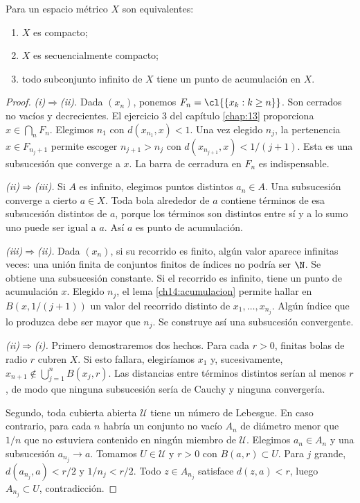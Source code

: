 \begin{teorema}\label{ch14:equivalencias}
Para un espacio métrico $X$ son equivalentes:
\begin{enumerate}[label=(\roman*)]
\item $X$ es compacto;
\item $X$ es secuencialmente compacto;
\item todo subconjunto infinito de $X$ tiene un punto de acumulación en $X$.
\end{enumerate}
\end{teorema}
\begin{proof}
\emph{(i)$\Rightarrow$(ii).} Dada $(x_n)$, ponemos $F_n=\cl{\{x_k:k\ge n\}}$. Son cerrados no vacíos y decrecientes. El ejercicio 3 del capítulo \ref{chap:13} proporciona $x\in\bigcap_nF_n$. Elegimos $n_1$ con $d(x_{n_1},x)<1$. Una vez elegido $n_j$, la pertenencia $x\in F_{n_j+1}$ permite escoger $n_{j+1}>n_j$ con $d(x_{n_{j+1}},x)<1/(j+1)$. Esta es una subsucesión que converge a $x$. La barra de cerradura en $F_n$ es indispensable.

\emph{(ii)$\Rightarrow$(iii).} Si $A$ es infinito, elegimos puntos distintos $a_n\in A$. Una subsucesión converge a cierto $a\in X$. Toda bola alrededor de $a$ contiene términos de esa subsucesión distintos de $a$, porque los términos son distintos entre sí y a lo sumo uno puede ser igual a $a$. Así $a$ es punto de acumulación.

\emph{(iii)$\Rightarrow$(ii).} Dada $(x_n)$, si su recorrido es finito, algún valor aparece infinitas veces: una unión finita de conjuntos finitos de índices no podría ser $\N$. Se obtiene una subsucesión constante. Si el recorrido es infinito, tiene un punto de acumulación $x$. Elegido $n_j$, el lema \ref{ch14:acumulacion} permite hallar en $B(x,1/(j+1))$ un valor del recorrido distinto de $x_1,\ldots,x_{n_j}$. Algún índice que lo produzca debe ser mayor que $n_j$. Se construye así una subsucesión convergente.

\emph{(ii)$\Rightarrow$(i).} Primero demostraremos dos hechos. Para cada $r>0$, finitas bolas de radio $r$ cubren $X$. Si esto fallara, elegiríamos $x_1$ y, sucesivamente, $x_{n+1}\notin\bigcup_{j=1}^nB(x_j,r)$. Las distancias entre términos distintos serían al menos $r$, de modo que ninguna subsucesión sería de Cauchy y ninguna convergería.

Segundo, toda cubierta abierta $\mathcal U$ tiene un número de Lebesgue. En caso contrario, para cada $n$ habría un conjunto no vacío $A_n$ de diámetro menor que $1/n$ que no estuviera contenido en ningún miembro de $\mathcal U$. Elegimos $a_n\in A_n$ y una subsucesión $a_{n_j}\to a$. Tomamos $U\in\mathcal U$ y $r>0$ con $B(a,r)\subset U$. Para $j$ grande, $d(a_{n_j},a)<r/2$ y $1/n_j<r/2$. Todo $z\in A_{n_j}$ satisface $d(z,a)<r$, luego $A_{n_j}\subset U$, contradicción.


\end{proof}
